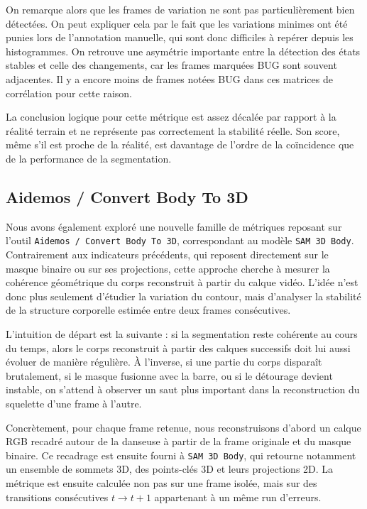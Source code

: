 \documentclass[11pt,a4paper]{article}
\begin{document}
On remarque alors que les frames de variation ne sont pas particulièrement bien détectées. On peut expliquer cela par le fait que les variations minimes ont été punies lors de l'annotation manuelle, qui sont donc difficiles à repérer depuis les histogrammes.
On retrouve une asymétrie importante entre la détection des états stables et celle des changements, car les frames marquées BUG sont souvent adjacentes.
Il y a encore moins de frames notées BUG dans ces matrices de corrélation pour cette raison.

La conclusion logique pour cette métrique est assez décalée par rapport à la réalité terrain et ne représente pas correctement la stabilité réelle. Son score, même s'il est proche de la réalité, est davantage de l'ordre de la coïncidence que de la performance de la segmentation.

\newpage %
\subsection{Aidemos / Convert Body To 3D}
Nous avons également exploré une nouvelle famille de métriques reposant sur l'outil \texttt{Aidemos / Convert Body To 3D}, correspondant au modèle \texttt{SAM 3D Body}. Contrairement aux indicateurs précédents, qui reposent directement sur le masque binaire ou sur ses projections, cette approche cherche à mesurer la cohérence géométrique du corps reconstruit à partir du calque vidéo. L'idée n'est donc plus seulement d'étudier la variation du contour, mais d'analyser la stabilité de la structure corporelle estimée entre deux frames consécutives.

L'intuition de départ est la suivante : si la segmentation reste cohérente au cours du temps, alors le corps reconstruit à partir des calques successifs doit lui aussi évoluer de manière régulière. À l'inverse, si une partie du corps disparaît brutalement, si le masque fusionne avec la barre, ou si le détourage devient instable, on s'attend à observer un saut plus important dans la reconstruction du squelette d'une frame à l'autre.

Concrètement, pour chaque frame retenue, nous reconstruisons d'abord un calque RGB recadré autour de la danseuse à partir de la frame originale et du masque binaire. Ce recadrage est ensuite fourni à \texttt{SAM 3D Body}, qui retourne notamment un ensemble de sommets 3D, des points-clés 3D et leurs projections 2D. La métrique est ensuite calculée non pas sur une frame isolée, mais sur des transitions consécutives $t \rightarrow t+1$ appartenant à un même run d'erreurs.
\end{document}
